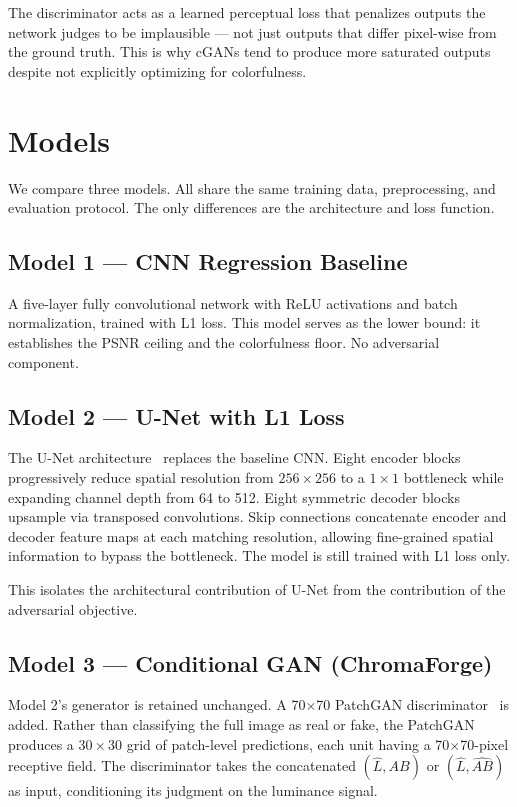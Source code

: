 \documentclass[11pt,a4paper]{article}
\begin{document}
The discriminator acts as a learned perceptual loss that penalizes outputs
the network judges to be implausible — not just outputs that differ pixel-wise
from the ground truth. This is why cGANs tend to produce more saturated outputs
despite not explicitly optimizing for colorfulness.

\section{Models}

We compare three models. All share the same training data, preprocessing, and
evaluation protocol. The only differences are the architecture and loss function.

\subsection{Model 1 — CNN Regression Baseline}

A five-layer fully convolutional network with ReLU activations and batch
normalization, trained with L1 loss. This model serves as the lower bound:
it establishes the PSNR ceiling and the colorfulness floor. No adversarial
component.

\subsection{Model 2 — U-Net with L1 Loss}

The U-Net architecture~\cite{ronneberger2015unet} replaces the baseline CNN.
Eight encoder blocks progressively reduce spatial resolution from $256\times256$
to a $1\times1$ bottleneck while expanding channel depth from 64 to 512.
Eight symmetric decoder blocks upsample via transposed convolutions.
Skip connections concatenate encoder and decoder feature maps at each matching
resolution, allowing fine-grained spatial information to bypass the bottleneck.
The model is still trained with L1 loss only.

This isolates the architectural contribution of U-Net from the contribution
of the adversarial objective.

\subsection{Model 3 — Conditional GAN (ChromaForge)}

Model 2's generator is retained unchanged. A 70$\times$70 PatchGAN
discriminator~\cite{isola2017pix2pix} is added. Rather than classifying the full
image as real or fake, the PatchGAN produces a $30\times30$ grid of patch-level
predictions, each unit having a 70$\times$70-pixel receptive field. The
discriminator takes the concatenated $(\hat{L}, AB)$ or $(\hat{L}, \hat{AB})$ as
input, conditioning its judgment on the luminance signal.
\end{document}
